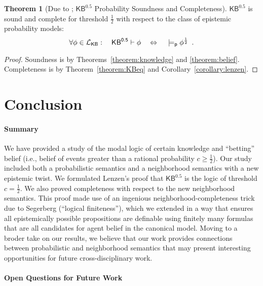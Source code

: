 \documentclass[12pt]{article}
\theoremstyle{definition}
\newtheorem{theorem}{Theorem}[section]
\newcommand{\Lang}{{\cal L}}   %
\newcommand{\KB}{{\mathsf{KB}}}                        %
\newcommand{\KBeq}{{\mathsf{KB}^{\mathsf{0.5}}}}       %
\newcommand{\modelsp}{\models_{\mathsf{p}}}                  %
\begin{document}
\begin{theorem}[Due to \cite{Lenzen1980:gwuw}; $\KBeq$
  Probability Soundness and Completeness]
  $\KBeq$ is sound and complete for threshold $\frac12$ with respect
  to the class of epistemic probability models:
  \[
  \textstyle 
  \forall\phi\in\Lang_\KB:\quad
  \KBeq\vdash\phi
   \quad\Leftrightarrow\quad
  {}\modelsp\phi^{\frac 12} \enspace.
  \]
\end{theorem}
\begin{proof}
  Soundness is by Theorems~\ref{theorem:knowledge} and
  \ref{theorem:belief}.  Completeness is by Theorem~\ref{theorem:KBeq}
  and Corollary~\ref{corollary:lenzen}.
\end{proof}

\section{Conclusion} 
\label{SectionFRW}

\paragraph{Summary}

We have provided a study of the modal logic of certain knowledge and
``betting'' belief (i.e., belief of events greater than a rational
probability $c\geq\frac 12$).  Our study included both a probabilistic
semantics and a neighborhood semantics with a new epistemic twist.  We
formulated Lenzen's proof that $\KBeq$ is the logic of threshold
$c=\frac 12$.  We also proved completeness with respect to the new
neighborhood semantics.  This proof made use of an ingenious
neighborhood-completeness trick due to Segerberg (``logical
finiteness''), which we extended in a way that ensures all
epistemically possible propositions are definable using finitely many
formulas that are all candidates for agent belief in the canonical
model. Moving to a broder take on our results, we believe that our
work provides connections between probabilistic and neighborhood
semantics that may present interesting opportunities for future
cross-disciplinary work.

\paragraph{Open Questions for Future Work}
\end{document}
